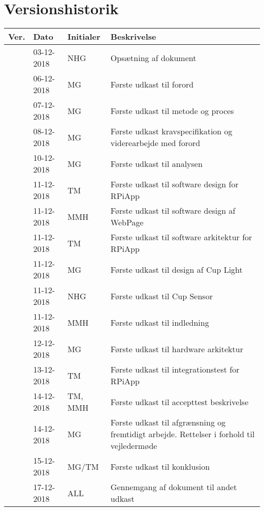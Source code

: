 \documentclass[Rapport/Rapport_main.tex]{subfiles}
\begin{document}
\section{Versionshistorik}
\begin{longtable}{|L{0.07\textwidth}|L{0.15\textwidth}|L{0.13\textwidth}|L{0.55\textwidth}|}
        \hline
        \textbf{Ver.} & \textbf{Dato} & \textbf{Initialer} & \textbf{Beskrivelse}  \\ \hline
        & 03-12-2018 & NHG & Opsætning af dokument \\ \hline
        & 06-12-2018 & MG & Første udkast til forord \\ \hline
        & 07-12-2018 & MG & Første udkast til metode og proces \\ \hline
        & 08-12-2018 & MG & Første udkast kravspecifikation og viderearbejde med forord \\ \hline
        & 10-12-2018 & MG & Første udkast til analysen \\ \hline
        & 11-12-2018 & TM & Første udkast til software design for RPiApp \\ \hline
        & 11-12-2018 & MMH & Første udkast til software design af WebPage \\ \hline
        & 11-12-2018 & TM & Første udkast til software arkitektur for RPiApp \\ \hline 
        & 11-12-2018 & MG & Første udkast til design af Cup Light \\ \hline 
        & 11-12-2018 & NHG & Første udkast til Cup Sensor \\ \hline
        & 11-12-2018 & MMH & Første udkast til indledning \\ \hline
        & 12-12-2018 & MG & Første udkast til hardware arkitektur \\ \hline
        & 13-12-2018 & TM & Første udkast til integrationstest for RPiApp \\\hline
        & 14-12-2018 & TM, MMH & Første udkast til accepttest beskrivelse \\ \hline
        & 14-12-2018 & MG & Første udkast til afgrænsning og fremtidigt arbejde. Rettelser i forhold til vejledermøde \\ \hline
        & 15-12-2018 & MG/TM & Første udkast til konklusion \\ \hline
        & 17-12-2018 & ALL & Gennemgang af dokument til andet udkast\\ \hline
\end{longtable}
\end{document}
